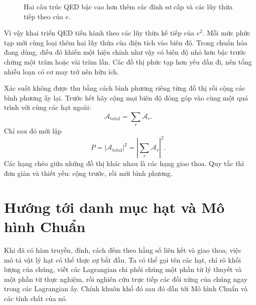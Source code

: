 \begin{figure}[htbp]
\centering
{}
\caption{Hai cấu trúc QED bậc cao hơn thêm các đỉnh sơ cấp và các lũy thừa tiếp theo của \(e\).}
\end{figure}

Vì vậy khai triển QED tiến hành theo các lũy thừa kế tiếp của \(e^2\). Mỗi mức phức tạp mới cùng loại thêm hai lũy thừa của điện tích vào biên độ. Trong chuẩn hóa đang dùng, điều đó khiến một hiệu chỉnh như vậy có biên độ nhỏ hơn bậc trước chừng một trăm hoặc vài trăm lần. Các đồ thị phức tạp hơn yếu dần đi, nên tổng nhiễu loạn có cơ may trở nên hữu ích.

Xác suất không được thu bằng cách bình phương riêng từng đồ thị rồi cộng các bình phương ấy lại. Trước hết hãy cộng mọi biên độ đóng góp vào cùng một quá trình với cùng các hạt ngoài:
\begin{equation}
\mathcal{A}_{\mathrm{total}}=\sum_r\mathcal{A}_r.
\end{equation}
Chỉ sau đó mới lập
\begin{equation}
P=\left|\mathcal{A}_{\mathrm{total}}\right|^2
=\left|\sum_r\mathcal{A}_r\right|^2.
\end{equation}
Các hạng chéo giữa những đồ thị khác nhau là các hạng giao thoa. Quy tắc thì đơn giản và thiết yếu: cộng trước, rồi mới bình phương.

\section{Hướng tới danh mục hạt và Mô hình Chuẩn}

Khi đã có hàm truyền, đỉnh, cách đếm theo hằng số liên kết và giao thoa, việc mô tả vật lý hạt có thể thực sự bắt đầu. Ta có thể gọi tên các hạt, chỉ rõ khối lượng của chúng, viết các Lagrangian chi phối chúng một phần từ lý thuyết và một phần từ thực nghiệm, rồi nghiên cứu trực tiếp các đối xứng của chúng ngay trong các Lagrangian ấy. Chính khuôn khổ đó sau đó dẫn tới Mô hình Chuẩn và các tính chất của nó.


